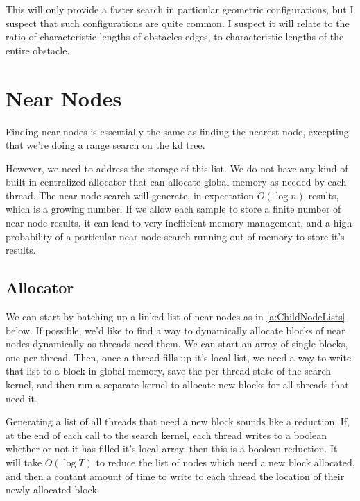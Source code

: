 This will only provide a faster search in particular geometric configurations, but I suspect that such configurations are quite common. I suspect it will relate to the ratio of characteristic lengths of obstacles edges, to characteristic lengths of the entire obstacle. 
 

\section{Near Nodes}
\label{a:NearNodes}
Finding near nodes is essentially the same as finding the nearest node, excepting that we're doing a range search on the kd tree. 

However, we need to address the storage of this list. We do not have any kind of built-in centralized allocator that can allocate global memory as needed by each thread. The near node search will generate, in expectation $O(\log n)$ results, which is a growing number. If we allow each sample to store a finite number of near node results, it can lead to very inefficient memory management, and a high probability of a particular near node search running out of memory to store it's results. 

\subsection{Allocator}
We can start by batching up a linked list of near nodes as in  \ref{a:ChildNodeLists} below. If possible, we'd like to find a way to dynamically allocate blocks of near nodes dynamically as threads need them. We can start an array of single blocks, one per thread. Then, once a thread fills up it's local list, we need a way to write that list to a block in global memory, save the per-thread state of the search kernel, and then run a separate kernel to allocate new blocks for all threads that need it. 

Generating a list of all threads that need a new block sounds like a reduction. If, at the end of each call to the search kernel, each thread writes to a boolean whether or not it has filled it's local array, then this is a boolean reduction. It will take $O(\log T)$ to reduce the list of nodes which need a new block allocated, and then a contant amount of time to write to each thread the location of their newly allocated block. 

